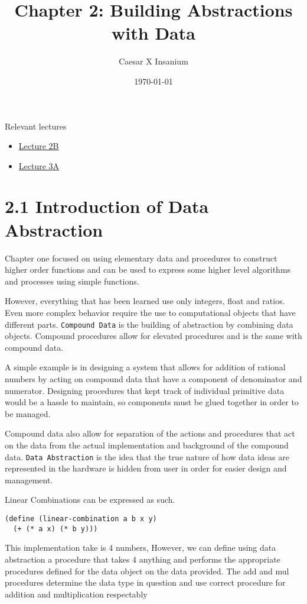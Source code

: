 \documentclass[11pt]{article}
\author{Caesar X Insanium}
\date{\today}
\title{Chapter 2: Building Abstractions with Data}
\begin{document}
\maketitle
\tableofcontents

Relevant lectures
\begin{itemize}
\item \href{https://www.youtube.com/watch?v=DrFkf-T-6Co\&t=3722s}{Lecture 2B}
\item \href{https://www.youtube.com/watch?v=PEwZL3H2oKg\&list=PLE18841CABEA24090\&index=5}{Lecture 3A}
\end{itemize}

\section{2.1 Introduction of Data Abstraction}
\label{sec:orga0c52be}

Chapter one focused on using elementary data and procedures to construct
higher order functions and can be used to express some higher level
algorithms and processes using simple functions.

However, everything that has been learned use only integers, float and
ratios. Even more complex behavior require the use to computational
objects that have different parts. \texttt{Compound Data} is the building of
abstraction by combining data objects. Compound procedures allow for
elevated procedures and is the same with compound data.

A simple example is in designing a system that allows for addition of
rational numbers by acting on compound data that have a component of
denominator and numerator. Designing procedures that kept track of
individual primitive data would be a hassle to maintain, so components
must be glued together in order to be managed.

Compound data also allow for separation of the actions and procedures
that act on the data from the actual implementation and background of
the compound data. \texttt{Data Abstraction} is the idea that the true nature
of how data ideas are represented in the hardware is hidden from user in
order for easier design and management.

Linear Combinations can be expressed as such.

\begin{verbatim}
(define (linear-combination a b x y)
  (+ (* a x) (* b y)))
\end{verbatim}

This implementation take is 4 numbers, However, we can define using data
abstraction a procedure that takes 4 anything and performs the
appropriate procedures defined for the data object on the data provided.
The add and mul procedures determine the data type in question and use
correct procedure for addition and multiplication respectably
\end{document}
